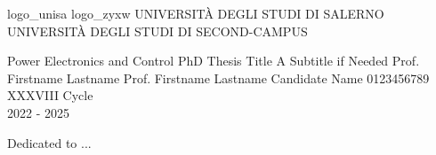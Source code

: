 \documentclass{pv_phd}
\begin{document}
\pagestyle{empty}

\setuniversities
  {logo_unisa}  
  {logo_zyxw}          
  {UNIVERSITÀ DEGLI STUDI DI SALERNO}
  {UNIVERSITÀ DEGLI STUDI DI SECOND-CAMPUS} 

\makefrontpage
  {Power Electronics and Control}      %
  {PhD Thesis Title}                   %
  {A Subtitle if Needed}               %
  {Prof. Firstname Lastname}           %
  {Prof. Firstname Lastname}           %
  {Candidate Name}                     %
  {0123456789}                         %
  {XXXVIII Cycle \\ 2022 - 2025}       %

\cleardoublepage
\thispagestyle{empty}

\cleardoublepage

\cleardoublepage
\begin{dedication}

    Dedicated to ...
    
\end{dedication}

\cleardoublepage
\tableofcontents
\clearpage
\sloppy
{}

\cleardoublepage        %
\setcounter{page}{1}    %
\pagestyle{headings}    %





\end{document}
